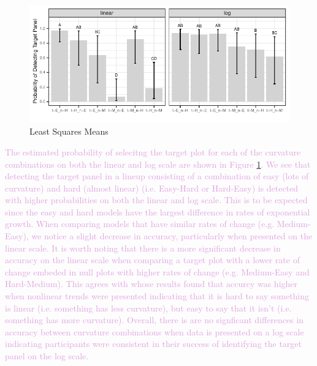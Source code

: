 \documentclass[]{interact}
\theoremstyle{plain}%
\theoremstyle{definition}
\theoremstyle{remark}
\begin{document}
\begin{figure}

{\centering \includegraphics{jsm-2021-student-paper-submission_files/figure-latex/lsmeans-plot-1} 

}

\caption{Least Squares Means}\label{fig:lsmeans-plot}
\end{figure}

\textcolor{Plum}{
The estimated probability of selecitng the target plot for each of the curvature combinations on both the linear and log scale are shown in Figure \ref{fig:lsmeans-plot}. 
We see that detecting the target panel in a lineup consisting of a combination of easy (lots of curvature) and hard (almost linear) (i.e. Easy-Hard or Hard-Easy) is detected with higher probabilities on both the linear and log scale. 
This is to be expected since the easy and hard models have the largest difference in rates of exponential growth.
When comparing models that have similar rates of change (e.g. Medium-Easy), we notice a slight decrease in accuracy, particularly when presented on the linear scale. 
It is worth noting that there is a more significant decrease in accuracy on the linear scale when comparing a target plot with a lower rate of change embeded in null plots with higher rates of change (e.g. Medium-Easy and Hard-Medium). 
This agrees with \cite{best_perception_2007} whose results found that accurcy was higher when nonlinear trends were presented indicating that it is hard to say something is linear (i.e. something has less curvature), but easy to say that it isn't (i.e. something has more curvature). 
Overall, there is are no signficant differences in accuracy between curvature combinations when data is presented on a log scale indicating participants were consistent in their success of identifying the target panel on the log scale. 
}
\end{document}
